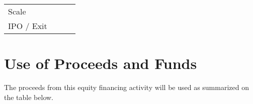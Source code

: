 \documentclass[10pt,openany]{book}
\begin{document}
\begin{longtable}[]{@{}llll@{}}
\begin{minipage}[t]{0.56\columnwidth}
Scale\strut
\end{minipage}\tabularnewline
\begin{minipage}[t]{0.13\columnwidth}\raggedright
IPO / Exit\strut
\end{minipage} & \begin{minipage}[t]{0.09\columnwidth}\raggedright
\strut
\end{minipage} & \begin{minipage}[t]{0.10\columnwidth}\raggedright
\strut
\end{minipage} & \begin{minipage}[t]{0.56\columnwidth}\raggedright
\strut
\end{minipage}\tabularnewline
\bottomrule
\end{longtable}

\newpage

\hypertarget{use-of-proceeds-and-funds}{%
\section{Use of Proceeds and Funds}\label{use-of-proceeds-and-funds}}

The proceeds from this equity financing activity will be used as
summarized on the table below.
\end{document}
